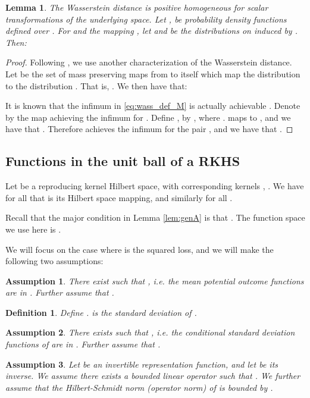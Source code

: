 \documentclass{article}
\newtheorem{thmappdef}{Definition}
\newtheorem{thmappasmp}{Assumption}
\newtheorem{thmapplem}{Lemma}
\begin{document}
\begin{thmapplem}\label{lem:wassinvar}
The Wasserstein distance is positive homogeneous for scalar transformations of the underlying space. Let ,  be probability density functions defined over . For  and
 the mapping , let  and  be the distributions on  induced by . Then:

\end{thmapplem}

\begin{proof}
Following \cite{villani2008optimal,tabak2016preconditioning}, we use another characterization of the Wasserstein  distance. Let  be the set of mass preserving maps from  to itself which map the distribution  to the distribution . That is,  . We then have that:

It is known that the infimum in \eqref{eq:wass_def_M} is actually achievable \citep[Theorem 5.2]{villani2008optimal}. Denote by  the map achieving the infimum for  . Define , by , where .   maps  to , and we have that . Therefore  achieves the infimum for the pair , and we have that .
\end{proof}

\subsection{Functions in the unit ball of a RKHS}\label{subsec:mmd}

Let  be a reproducing kernel Hilbert space, with corresponding kernels , . We have for all  that   is its Hilbert space mapping, and similarly  for all .

Recall that the major condition in Lemma \ref{lem:genA} is that . The function space  we use here is .

We will focus on the case where  is the squared loss, and we will make the following two assumptions:

\begin{thmappasmp}\label{asmp:yinrkhs}
There exist  such that , i.e.
the mean potential outcome functions  are in .   Further assume that .
\end{thmappasmp}

\begin{thmappdef}\label{def:eta}
Define .  is the standard deviation of .
\end{thmappdef}

\begin{thmappasmp}\label{asmp:etainrkhs}
There exists  such that , i.e. the conditional standard deviation functions of  are in . Further assume that .
\end{thmappasmp}
\begin{thmappasmp}\label{asmp:phiinrkhs}
Let  be an invertible representation function, and let  be its inverse.
We assume there exists a bounded linear operator  such that . We further assume that the Hilbert-Schmidt norm (operator norm)  of  is bounded by .
\end{thmappasmp}
\end{document}
